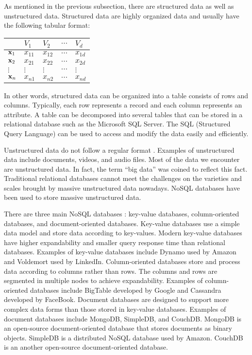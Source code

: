 \documentclass[12pt]{article}
\newcommand{\bfx}[1]{{\bf #1}}
\begin{document}
As mentioned in the previous subsection, there are structured data as well as unstructured data. Structured data are highly organized data and usually have the following tabular format:
\begin{center}
\begin{tabular}{lllll}
\toprule
 & $V_1$ & $V_2$ & $\cdots$ & $V_d$ \\
\midrule
$\bfx{x}_1$ & $x_{11}$ & $x_{12}$ & $\cdots$ & $x_{1d}$ \\
$\bfx{x}_2$ & $x_{21}$ & $x_{22}$ & $\cdots$ & $x_{2d}$ \\
$\vdots$ & $\vdots$ & $\vdots$ & $\cdots$ & $\vdots$ \\
$\bfx{x}_n$ & $x_{n1}$ & $x_{n2}$ & $\cdots$ & $x_{nd}$ \\
\bottomrule
\end{tabular}
\end{center}
In other words, structured data can be organized into a table consists of rows and columns. Typically, each row represents a record and each column represents an attribute. A table can be decomposed into several tables that can be stored in a relational database such as the Microsoft SQL Server. The SQL (Structured Query Language) can be used to access and modify the data easily and efficiently.

Unstructured data do not follow a regular format \citep{abdullah2013data}. Examples of unstructured data include documents, videos, and audio files. Most of the data we encounter are unstructured data. In fact, the term ``big data'' was coined to reflect this fact. Traditional relational databases cannot meet the challenges on the varieties and scales brought by massive unstructured data nowadays. NoSQL databases have been used to store massive unstructured data. 

There are three main NoSQL databases \citep{chen2014b}: key-value databases, column-oriented databases, and document-oriented databases. Key-value databases use a simple data model and store data according to key-values. Modern key-value databases have higher expandability and smaller query response time than relational databases. Examples of key-value databases include Dynamo used by Amazon and Voldemort used by LinkedIn. Column-oriented databases store and process data according to columns rather than rows. The columns and rows are segmented in multiple nodes to achieve expandability. Examples of column-oriented databases include BigTable developed by Google and Cassandra developed by FaceBook. Document databases are designed to support more complex data forms than those stored in key-value databases. Examples of document databases include MongoDB, SimpleDB, and CouchDB. MongoDB is an open-source document-oriented database that stores documents as binary objects. SimpleDB is a distributed NoSQL database used by Amazon. CouchDB is an another open-source document-oriented database. 
\end{document}
